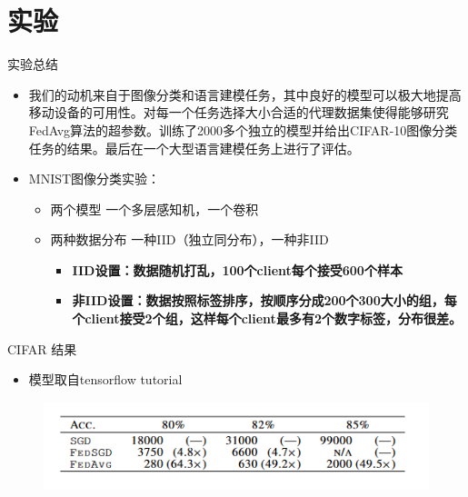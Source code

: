 \documentclass{beamer}
\begin{document}
\section{实验}
\begin{frame}{实验总结}
    \begin{itemize}
        \item 我们的动机来自于图像分类和语言建模任务，其中良好的模型可以极大地提高移动设备的可用性。对每一个任务选择大小合适的代理数据集使得能够研究FedAvg算法的超参数。训练了2000多个独立的模型并给出CIFAR-10图像分类任务的结果。最后在一个大型语言建模任务上进行了评估。
        \item MNIST图像分类实验：
        \begin{itemize}
            \item 两个模型 一个多层感知机，一个卷积
            \item 两种数据分布 一种IID（独立同分布），一种非IID
            \begin{itemize}
                \item \textbf{IID设置：数据随机打乱，100个client每个接受600个样本}
                \item \textbf{非IID设置：数据按照标签排序，按顺序分成200个300大小的组，每个client接受2个组，这样每个client最多有2个数字标签，分布很差。}
            \end{itemize}
        \end{itemize}
    \end{itemize}
\end{frame}
\begin{frame}{CIFAR {\songti 结果}}
    \begin{itemize}
        \item 模型取自tensorflow tutorial
    \end{itemize}
    \begin{figure}
        \centering
        \includegraphics[scale=0.7]{images/CIFARresult.png}
    \end{figure}
\end{frame}
\end{document}
